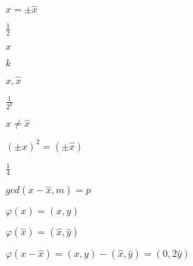 \documentclass[10pt]{book}
\begin{document}
\begin{mdSnippets}
\begin{mdInlineSnippet}[4b4c50fe103d5c99d883bc1eaefa227f]%
$x = \pm\hat{x}$\end{mdInlineSnippet}%
\begin{mdInlineSnippet}[93b05c90d14a117ba52da1d743a43ab1]%
$\frac{1}{2}$\end{mdInlineSnippet}%
\begin{mdInlineSnippet}[9dd4e461268c8034f5c8564e155c67a6]%
$x$\end{mdInlineSnippet}%
\begin{mdInlineSnippet}[8ce4b16b22b58894aa86c421e8759df3]%
$k$\end{mdInlineSnippet}%
\begin{mdInlineSnippet}[58010065c5914ea8e1d02ea076ceccb4]%
$x,\hat{x}$\end{mdInlineSnippet}%
\begin{mdInlineSnippet}[3d9ae6d78cecffb391ef7928094b8d97]%
$\frac{1}{2^k}$\end{mdInlineSnippet}%
\begin{mdInlineSnippet}[07ad31d2b7c7230672acb4ea76fc8ad5]%
$x \neq \hat{x}$\end{mdInlineSnippet}%
\begin{mdInlineSnippet}[1dd2eaea317b1ee3c992899ca7a01cb1]%
$(\pm x)^2 = (\pm \hat{x})$\end{mdInlineSnippet}%
\begin{mdInlineSnippet}[eca3bf81573307ec3002cf846390d363]%
$\frac{1}{4}$\end{mdInlineSnippet}%
\begin{mdInlineSnippet}[2f9f317072d221079d124cfe5c6f2af9]%
$gcd(x - \hat{x},m) = p$\end{mdInlineSnippet}%
\begin{mdInlineSnippet}[3b67669de481e6a872ecc05f901b17bd]%
$\varphi(x) = (x,y)$\end{mdInlineSnippet}%
\begin{mdInlineSnippet}[5f7e4bec038b9c9e6621e4f53cb13478]%
$\varphi(\hat{x}) = (\hat{x},\hat{y})$\end{mdInlineSnippet}%
\begin{mdInlineSnippet}[e975db04f2787ff246f771a1215760c6]%
$\varphi(x - \hat{x}) = (x,y) - (\hat{x},\hat{y}) = (0,2\hat{y})$\end{mdInlineSnippet}%

\end{mdSnippets}
\end{document}
